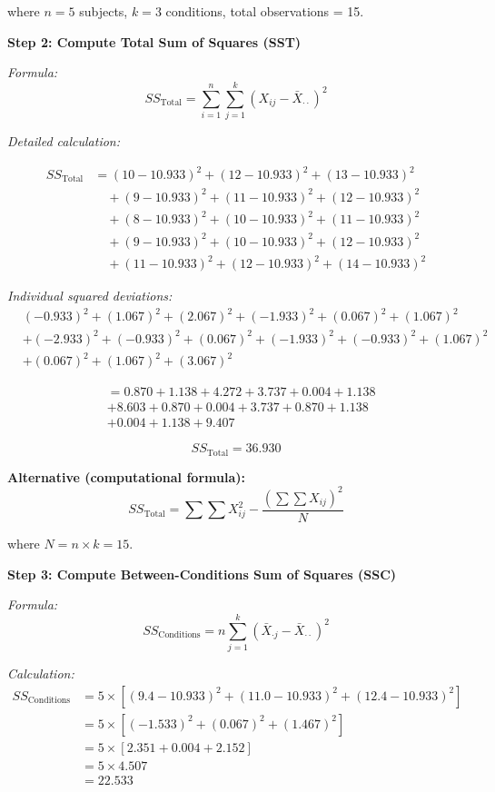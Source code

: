 \documentclass[12pt]{article}
\begin{document}
\begin{solution}
where $n = 5$ subjects, $k = 3$ conditions, total observations = 15.

\textbf{Step 2: Compute Total Sum of Squares (SST)}

\textit{Formula:}
\[
SS_{\text{Total}} = \sum_{i=1}^{n}\sum_{j=1}^{k} (X_{ij} - \bar{X}_{\cdot\cdot})^2
\]

\textit{Detailed calculation:}

\begin{align*}
SS_{\text{Total}} &= (10 - 10.933)^2 + (12 - 10.933)^2 + (13 - 10.933)^2 \\
&\quad + (9 - 10.933)^2 + (11 - 10.933)^2 + (12 - 10.933)^2 \\
&\quad + (8 - 10.933)^2 + (10 - 10.933)^2 + (11 - 10.933)^2 \\
&\quad + (9 - 10.933)^2 + (10 - 10.933)^2 + (12 - 10.933)^2 \\
&\quad + (11 - 10.933)^2 + (12 - 10.933)^2 + (14 - 10.933)^2
\end{align*}

\textit{Individual squared deviations:}
\begin{align*}
&(-0.933)^2 + (1.067)^2 + (2.067)^2 + (-1.933)^2 + (0.067)^2 + (1.067)^2 \\
&+ (-2.933)^2 + (-0.933)^2 + (0.067)^2 + (-1.933)^2 + (-0.933)^2 + (1.067)^2 \\
&+ (0.067)^2 + (1.067)^2 + (3.067)^2
\end{align*}

\begin{align*}
&= 0.870 + 1.138 + 4.272 + 3.737 + 0.004 + 1.138 \\
&+ 8.603 + 0.870 + 0.004 + 3.737 + 0.870 + 1.138 \\
&+ 0.004 + 1.138 + 9.407
\end{align*}

\[
SS_{\text{Total}} = 36.930
\]

\textbf{Alternative (computational formula):}
\[
SS_{\text{Total}} = \sum\sum X_{ij}^2 - \frac{(\sum\sum X_{ij})^2}{N}
\]

where $N = n \times k = 15$.

\textbf{Step 3: Compute Between-Conditions Sum of Squares (SSC)}

\textit{Formula:}
\[
SS_{\text{Conditions}} = n \sum_{j=1}^{k} (\bar{X}_{\cdot j} - \bar{X}_{\cdot\cdot})^2
\]

\textit{Calculation:}
\begin{align*}
SS_{\text{Conditions}} &= 5 \times [(9.4 - 10.933)^2 + (11.0 - 10.933)^2 + (12.4 - 10.933)^2] \\
&= 5 \times [(-1.533)^2 + (0.067)^2 + (1.467)^2] \\
&= 5 \times [2.351 + 0.004 + 2.152] \\
&= 5 \times 4.507 \\
&= 22.533
\end{align*}


\end{solution}
\end{document}
